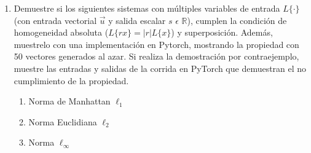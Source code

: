 \documentclass[12 pt]{article}
\begin{document}
\begin{enumerate}
\begin{lstlisting}[language=Python]{myc,label=compare}
L_linear = alpha*torch.abs(u1) + beta*torch.abs(u2)
print(f"alpha*torch.abs(u1) + beta*torch.abs(u2): \n{L_linear}\n")

compare_outputs(L_input, L_linear)
\end{lstlisting}

Obteniendo:

\begin{lstlisting}
|alpha*u1 + beta*u2|: 
tensor([0.0676, 0.3416, 0.1597, 0.2543, 0.3450, 0.3919, 0.2583, 0.3255, 0.3054,
        0.1585, 0.1478, 0.0515, 0.2588, 0.2356, 0.0394, 0.2256, 0.2625, 0.3124,
        0.2099, 0.0970, 0.1913, 0.3363, 0.2541, 0.2613, 0.3136, 0.0160, 0.1336,
        0.1396, 0.2189, 0.1833, 0.2643, 0.3006, 0.3770, 0.0694, 0.1807, 0.2491,
        0.1773, 0.1561, 0.1227, 0.3277, 0.1527, 0.2303, 0.2733, 0.1180, 0.2439,
        0.1801, 0.2808, 0.2889, 0.1250, 0.2730])

alpha*torch.abs(u1) + beta*torch.abs(u2): 
tensor([0.0676, 0.3416, 0.1597, 0.2543, 0.3450, 0.3919, 0.2583, 0.3255, 0.3054,
        0.1585, 0.1478, 0.0515, 0.2588, 0.2356, 0.0394, 0.2256, 0.2625, 0.3124,
        0.2099, 0.0970, 0.1913, 0.3363, 0.2541, 0.2613, 0.3136, 0.0160, 0.1336,
        0.1396, 0.2189, 0.1833, 0.2643, 0.3006, 0.3770, 0.0694, 0.1807, 0.2491,
        0.1773, 0.1561, 0.1227, 0.3277, 0.1527, 0.2303, 0.2733, 0.1180, 0.2439,
        0.1801, 0.2808, 0.2889, 0.1250, 0.2730])

Las salidas son iguales, se cumple la superposicion y la homogeneidad
\end{lstlisting}

Los valores de ${\alpha}$ y ${\beta}$ son mayores a 0, por lo que se demuestra la linealidad para este caso.

\item Demuestre si los siguientes sistemas con múltiples variables
de entrada ${L\{ \cdot \}}$ (con entrada vectorial ${\vec{u}}$ y salida escalar ${s}$ ${\epsilon}$ ${\mathbb{R}}$), cumplen la condición de homogeneidad absoluta (${L\{ rx \} = |r|L\{ x \}}$) y superposición. Además, muestrelo con una implementación en Pytorch, mostrando la propiedad con 50 vectores generados al azar. Si realiza la demostración por contraejemplo, muestre las entradas y salidas de la corrida en PyTorch que demuestran el no cumplimiento de la propiedad.

\begin{enumerate}
    \item Norma de Manhattan ${\ell_{1}}$
    \item Norma Euclidiana ${\ell_{2}}$
    \item Norma ${\ell_{\infty}}$
\end{enumerate}


\end{enumerate}
\end{document}
